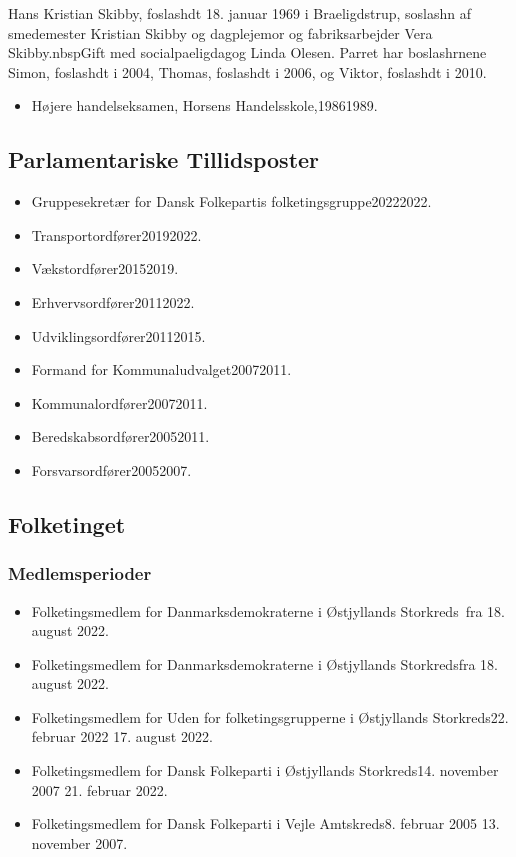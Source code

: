\documentclass[11pt, a4paper]{awesome-cv}
\begin{document}
\makecvheader[R]
\makelettertitle
\begin{cvletter}
Hans Kristian Skibby, foslashdt 18. januar 1969 i Braeligdstrup, soslashn af smedemester Kristian Skibby og dagplejemor og fabriksarbejder Vera Skibby.nbspGift med socialpaeligdagog Linda Olesen. Parret har boslashrnene Simon, foslashdt i 2004, Thomas, foslashdt i 2006, og Viktor, foslashdt i 2010.

\begin{itemize}
\item Højere handelseksamen, Horsens Handelsskole,19861989.
\end{itemize}
\subsection*{Parlamentariske Tillidsposter}
\begin{itemize}
\item Gruppesekretær for Dansk Folkepartis folketingsgruppe20222022.
\item Transportordfører20192022.
\item Vækstordfører20152019.
\item Erhvervsordfører20112022.
\item Udviklingsordfører20112015.
\item Formand for Kommunaludvalget20072011.
\item Kommunalordfører20072011.
\item Beredskabsordfører20052011.
\item Forsvarsordfører20052007.
\end{itemize}
\subsection*{Folketinget}
\subsubsection*{Medlemsperioder}
\begin{itemize}
\item Folketingsmedlem for Danmarksdemokraterne i Østjyllands Storkreds fra 18. august 2022.
\item Folketingsmedlem for Danmarksdemokraterne i Østjyllands Storkredsfra 18. august 2022.
\item Folketingsmedlem for Uden for folketingsgrupperne i Østjyllands Storkreds22. februar 2022  17. august 2022.
\item Folketingsmedlem for Dansk Folkeparti i Østjyllands Storkreds14. november 2007  21. februar 2022.
\item Folketingsmedlem for Dansk Folkeparti i Vejle Amtskreds8. februar 2005  13. november 2007.
\end{itemize}

\end{cvletter}
\end{document}
